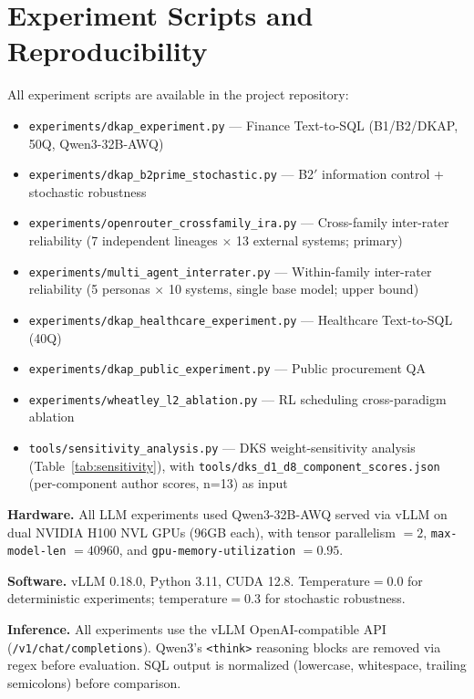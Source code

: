 \documentclass[10pt,a4paper]{article}
\begin{document}
\section{Experiment Scripts and Reproducibility}
\label{sec:reproducibility}

All experiment scripts are available in the project repository:

\begin{itemize}
\item \texttt{experiments/dkap\_experiment.py} --- Finance Text-to-SQL (B1/B2/DKAP, 50Q, Qwen3-32B-AWQ)
\item \texttt{experiments/dkap\_b2prime\_stochastic.py} --- B2$'$ information control + stochastic robustness
\item \texttt{experiments/openrouter\_crossfamily\_ira.py} --- Cross-family inter-rater reliability (7 independent lineages $\times$ 13 external systems; primary)
\item \texttt{experiments/multi\_agent\_interrater.py} --- Within-family inter-rater reliability (5 personas $\times$ 10 systems, single base model; upper bound)
\item \texttt{experiments/dkap\_healthcare\_experiment.py} --- Healthcare Text-to-SQL (40Q)
\item \texttt{experiments/dkap\_public\_experiment.py} --- Public procurement QA
\item \texttt{experiments/wheatley\_l2\_ablation.py} --- RL scheduling cross-paradigm ablation
\item \texttt{tools/sensitivity\_analysis.py} --- DKS weight-sensitivity analysis (Table~\ref{tab:sensitivity}), with \texttt{tools/dks\_d1\_d8\_component\_scores.json} (per-component author scores, n=13) as input
\end{itemize}

\textbf{Hardware.} All LLM experiments used Qwen3-32B-AWQ served via vLLM on dual NVIDIA H100 NVL GPUs (96GB each), with tensor parallelism $=2$, \texttt{max-model-len} $=40960$, and \texttt{gpu-memory-utilization} $=0.95$.

\textbf{Software.} vLLM 0.18.0, Python 3.11, CUDA 12.8. Temperature$=$0.0 for deterministic experiments; temperature$=$0.3 for stochastic robustness.

\textbf{Inference.} All experiments use the vLLM OpenAI-compatible API (\texttt{/v1/chat/completions}). Qwen3's \texttt{<think>} reasoning blocks are removed via regex before evaluation. SQL output is normalized (lowercase, whitespace, trailing semicolons) before comparison.
\end{document}
